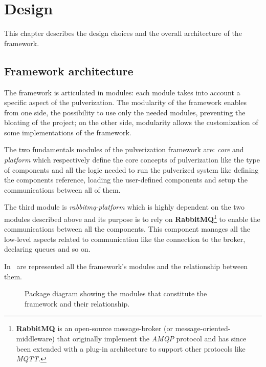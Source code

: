 \chapter{Design} %
\label{chap:design}

This chapter describes the design choices and the overall architecture of the framework. 

\section{Framework architecture}
\label{sec:arch-design}

The framework is articulated in modules: each module takes into account a specific aspect of the pulverization.
The modularity of the framework enables from one side, the possibility to use only the needed modules, preventing the bloating of the project;
on the other side, modularity allows the customization of some implementations of the framework.

The two fundamentals modules of the pulverization framework are: \emph{core} and \emph{platform} which respectively define the core concepts
of pulverization like the type of components and all the logic needed to run the pulverized system like defining the components reference,
loading the user-defined components and setup the communications between all of them.

The third module is \emph{rabbitmq-platform} which is highly dependent on the two modules described above and its purpose is to rely on
\textbf{RabbitMQ}\footnote{\textbf{RabbitMQ} is an open-source message-broker (or message-oriented-middleware) that originally implement
	the \emph{AMQP} protocol and has since been extended with a plug-in architecture to support other protocols like \emph{MQTT}.} to enable
the communications between all the components.
This component manages all the low-level aspects related to communication like the connection to the broker, declaring queues and so on.

In~ are represented all the framework's modules and the relationship between them.

\begin{figure}
	\centering
	\caption{Package diagram showing the modules that constitute the framework and their relationship.}
	\label{fig:package-diagram}
\end{figure}


